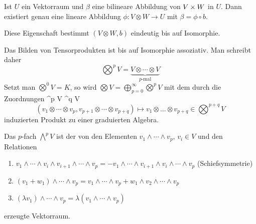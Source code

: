 \begin{emptythm}
Ist $U$ ein Vektorraum und $\beta$ eine bilineare Abbildung von $V \times W$ in $U$. Dann existiert genau eine lineare Abbildung $\phi: V \otimes W \to U$ mit $\beta = \phi \circ b$.
\begin{center}\end{center}
Diese Eigenschaft bestimmt $(V \otimes W, b)$ eindeutig bis auf Isomorphie.
\end{emptythm}

Das Bilden von Tensorprodukten ist bis auf Isomorphie assoziativ. Man schreibt daher
	\[ \bigotimes^p V = \underbrace{V \otimes \cdots \otimes V}_{p\text{-mal}} \]
Setzt man $\bigotimes^0 V = K$, so wird $\bigotimes V = \bigoplus_{p=0}^{\infty} \bigotimes^p V$ mit dem durch die Zuordnungen
	\bigotimes^p V \times \bigotimes^q V\ni\[ (v_1 \otimes \cdots \otimes v_p, v_{p+1} \otimes \cdots \otimes v_{p+q}) \mapsto v_1 \otimes \ldots \otimes v_{p+q} \in \bigotimes^{p+q} V \]
induzierten Produkt zu einer graduierten Algebra.

Das $p$-fach  $\bigwedge^pV$ ist der von den Elementen $v_1 \wedge \cdots \wedge v_p$, $v_i \in V$ und den Relationen \begin{enumerate}[label=(\roman*),widest=iii]
\item
	$v_1 \wedge \cdots \wedge v_i \wedge v_{i+1} \wedge \cdots \wedge v_p = - v_1 \wedge \cdots \wedge v_{i+1} \wedge v_i \wedge \cdots \wedge v_p$ (Schiefsymmetrie)
\item
	$(v_1 + w_1) \wedge \cdots \wedge v_p = v_1 \wedge \cdots \wedge v_p + w_1 \wedge v_2 \wedge \cdots \wedge v_p$
\item
	$(\lambda v_1) \wedge \cdots \wedge v_p = \lambda (v_1 \wedge \cdots \wedge v_p)$
\end{enumerate}
erzeugte Vektorraum.

